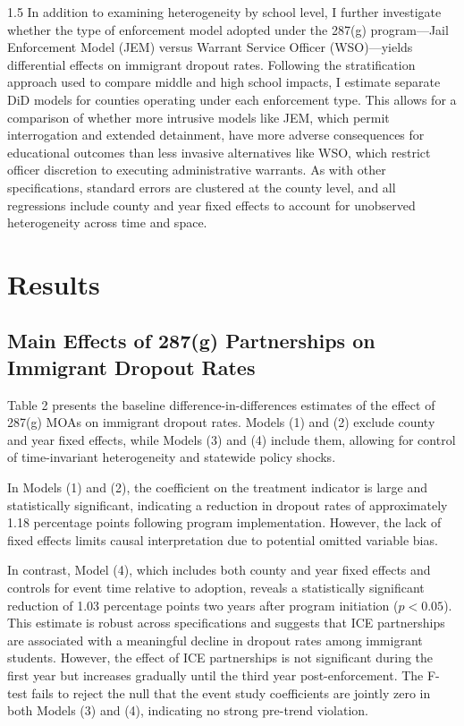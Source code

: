 \documentclass[12pt]{article}
\begin{document}
\begin{spacing}{1.5}
In addition to examining heterogeneity by school level, I further investigate whether the type of enforcement model adopted under the 287(g) program—Jail Enforcement Model (JEM) versus Warrant Service Officer (WSO)—yields differential effects on immigrant dropout rates. Following the stratification approach used to compare middle and high school impacts, I estimate separate DiD models for counties operating under each enforcement type. This allows for a comparison of whether more intrusive models like JEM, which permit interrogation and extended detainment, have more adverse consequences for educational outcomes than less invasive alternatives like WSO, which restrict officer discretion to executing administrative warrants. As with other specifications, standard errors are clustered at the county level, and all regressions include county and year fixed effects to account for unobserved heterogeneity across time and space.

\section{Results}
\subsection{Main Effects of 287(g) Partnerships on Immigrant Dropout Rates}
Table 2 presents the baseline difference-in-differences estimates of the effect of 287(g) MOAs on immigrant dropout rates. Models (1) and (2) exclude county and year fixed effects, while Models (3) and (4) include them, allowing for control of time-invariant heterogeneity and statewide policy shocks.

In Models (1) and (2), the coefficient on the treatment indicator is large and statistically significant, indicating a reduction in dropout rates of approximately 1.18 percentage points following program implementation. However, the lack of fixed effects limits causal interpretation due to potential omitted variable bias.

In contrast, Model (4), which includes both county and year fixed effects and controls for event time relative to adoption, reveals a statistically significant reduction of 1.03 percentage points two years after program initiation ($p < 0.05$). This estimate is robust across specifications and suggests that ICE partnerships are associated with a meaningful decline in dropout rates among immigrant students. However, the effect of ICE partnerships is not significant during the first year but increases gradually until the third year post-enforcement. The F-test fails to reject the null that the event study coefficients are jointly zero in both Models (3) and (4), indicating no strong pre-trend violation.


\end{spacing}
\end{document}
